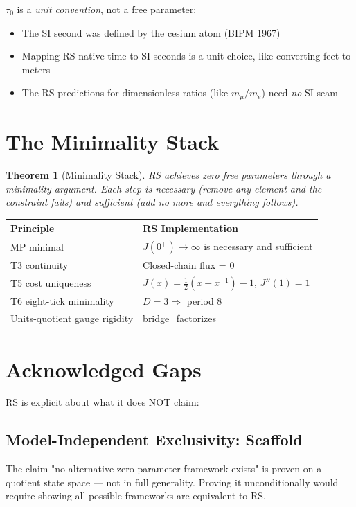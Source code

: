 \documentclass[12pt,a4paper]{article}
\newtheorem{theorem}{Theorem}[section]
\theoremstyle{definition}
\theoremstyle{remark}
\begin{document}
$\tau_0$ is a \emph{unit convention}, not a free parameter:
\begin{itemize}
\item The SI second was defined by the cesium atom (BIPM 1967)
\item Mapping RS-native time to SI seconds is a unit choice, like converting feet to meters
\item The RS predictions for dimensionless ratios (like $m_\mu/m_e$) need \emph{no} SI seam
\end{itemize}

\section{The Minimality Stack}

\begin{theorem}[Minimality Stack]
RS achieves zero free parameters through a minimality argument.
Each step is necessary (remove any element and the constraint fails) and 
sufficient (add no more and everything follows).
\end{theorem}

\begin{center}
\begin{tabular}{ll}
\hline
Principle & RS Implementation \\
\hline
MP minimal & $J(0^+) \to \infty$ is necessary and sufficient \\
T3 continuity & Closed-chain flux = 0 \\
T5 cost uniqueness & $J(x) = \frac{1}{2}(x+x^{-1})-1$, $J''(1) = 1$ \\
T6 eight-tick minimality & $D = 3 \Rightarrow$ period 8 \\
Units-quotient gauge rigidity & bridge\_factorizes \\
\hline
\end{tabular}
\end{center}

\section{Acknowledged Gaps}

RS is explicit about what it does NOT claim:

\subsection{Model-Independent Exclusivity: Scaffold}

The claim "no alternative zero-parameter framework exists" is proven on a 
quotient state space — not in full generality. Proving it unconditionally 
would require showing all possible frameworks are equivalent to RS.
\end{document}
